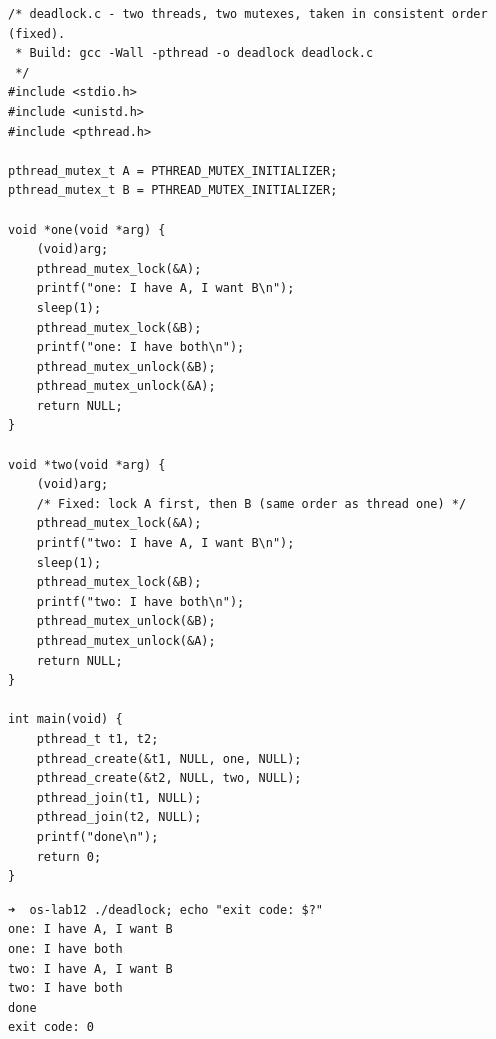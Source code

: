 \documentclass{labreport}
\begin{document}
\begin{lstlisting}[style=c]
/* deadlock.c - two threads, two mutexes, taken in consistent order (fixed).
 * Build: gcc -Wall -pthread -o deadlock deadlock.c
 */
#include <stdio.h>
#include <unistd.h>
#include <pthread.h>

pthread_mutex_t A = PTHREAD_MUTEX_INITIALIZER;
pthread_mutex_t B = PTHREAD_MUTEX_INITIALIZER;

void *one(void *arg) {
    (void)arg;
    pthread_mutex_lock(&A);
    printf("one: I have A, I want B\n");
    sleep(1);
    pthread_mutex_lock(&B);
    printf("one: I have both\n");
    pthread_mutex_unlock(&B);
    pthread_mutex_unlock(&A);
    return NULL;
}

void *two(void *arg) {
    (void)arg;
    /* Fixed: lock A first, then B (same order as thread one) */
    pthread_mutex_lock(&A);
    printf("two: I have A, I want B\n");
    sleep(1);
    pthread_mutex_lock(&B);
    printf("two: I have both\n");
    pthread_mutex_unlock(&B);
    pthread_mutex_unlock(&A);
    return NULL;
}

int main(void) {
    pthread_t t1, t2;
    pthread_create(&t1, NULL, one, NULL);
    pthread_create(&t2, NULL, two, NULL);
    pthread_join(t1, NULL);
    pthread_join(t2, NULL);
    printf("done\n");
    return 0;
}
\end{lstlisting}

\begin{lstlisting}[style=bash]
➜  os-lab12 ./deadlock; echo "exit code: $?"
one: I have A, I want B
one: I have both
two: I have A, I want B
two: I have both
done
exit code: 0
\end{lstlisting}
\end{document}
